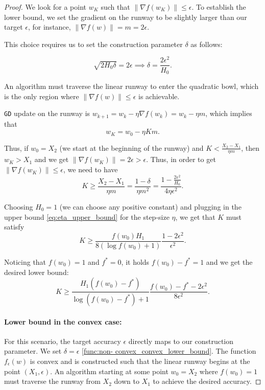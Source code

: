 \documentclass[a4paper,11pt]{article}
\newcommand{\algname}[1]{\texttt{#1}}
\newcommand{\1}{\mathbbm{1}}
\theoremstyle{plain}
\begin{document}
\begin{proof}
We look for a point $w_K$ such that $\|\nabla f(w_K)\| \leq \epsilon$.
To establish the lower bound, we set the gradient on the runway to be slightly larger than our target $\epsilon$, for instance, $\|\nabla f(w)\| = m = 2\epsilon$.

This choice requires us to set the construction parameter $\delta$ as follows:

$$
 \sqrt{2H_0\delta} = 2\epsilon \implies \delta = \frac{2\epsilon^2}{H_0}. 
$$

An algorithm must traverse the linear runway to enter the quadratic bowl, which is the only region where $\|\nabla f(w)\| \leq \epsilon$ is achievable.

\algname{GD} update on the runway is $w_{k+1} = w_k - \eta \nabla f(w_k) = w_k - \eta m$, which implies that
\begin{equation*}
    w_K = w_0 - \eta K m.
\end{equation*}

Thus, if $w_0 = X_2$ (we start at the beginning of the runway) and $K < \frac{X_2-X_1}{\eta m}$, then $w_K > X_1$ and we get $\|\nabla f(w_K)\|=2\epsilon>\epsilon$. Thus, in order to get $\|\nabla f(w_K)\| \leq \epsilon$, we need to have 
\begin{equation*}
    K \geq \frac{X_2-X_1}{\eta m} = \frac{1-\delta}{\eta m^2} = \frac{1-\frac{2 \epsilon^2}{H_0}}{4 \eta \epsilon^2}.
\end{equation*}

Choosing $H_0=1$ (we can choose any positive constant) and plugging in the upper bound \eqref{eq:eta_upper_bound} for the step-size $\eta$, we get that $K$ must satisfy
\begin{equation*}
   K \geq \frac{f(w_0)H_1}{8(\log f(w_0)+1)} \frac{1-2 \epsilon^2}{\epsilon^2}. 
\end{equation*}

Noticing that $f(w_0)=1$ and $f^*=0$, it holds $f(w_0)-f^*=1$ and we get the desired lower bound:
\begin{equation*}
    K \geq \frac{H_1 (f(w_0)-f^*)}{\log (f(w_0)-f^*)+1} \frac{f(w_0)-f^*-2\epsilon^2}{8 \epsilon^2}.
\end{equation*}


\paragraph{Lower bound in the convex case:}
For this scenario, the target accuracy $\epsilon$ directly maps to our construction parameter. We set $\delta = \epsilon$ \eqref{func:non- convex_convex_lower_bound}.
The function $f_\epsilon(w)$ is convex and is constructed such that the linear runway begins at the point $(X_1, \epsilon)$. An algorithm starting at some point $w_0=X_2$ where $f(w_0) =1$ must traverse the runway from $X_2$ down to $X_1$ to achieve the desired accuracy.


\end{proof}
\end{document}
